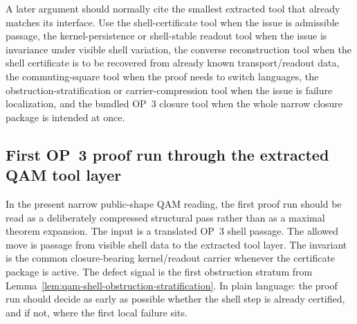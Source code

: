 \begin{remark}\label{rem:qam-op3-tool-usage}
A later argument should normally cite the smallest extracted tool that already matches its interface. Use the shell-certificate tool when the issue is admissible passage, the kernel-persistence or shell-stable readout tool when the issue is invariance under visible shell variation, the converse reconstruction tool when the shell certificate is to be recovered from already known transport/readout data, the commuting-square tool when the proof needs to switch languages, the obstruction-stratification or carrier-compression tool when the issue is failure localization, and the bundled OP~3 closure tool when the whole narrow closure package is intended at once.
\end{remark}


\subsection*{First OP~3 proof run through the extracted QAM tool layer}

\begin{remark}\label{rem:qam-op3-proof-run-reading-key}
In the present narrow public-shape QAM reading, the first proof run should be read as a deliberately compressed structural pass rather than as a maximal theorem expansion. The input is a translated OP~3 shell passage. The allowed move is passage from visible shell data to the extracted tool layer. The invariant is the common closure-bearing kernel/readout carrier whenever the certificate package is active. The defect signal is the first obstruction stratum from Lemma~\ref{lem:qam-shell-obstruction-stratification}. In plain language: the proof run should decide as early as possible whether the shell step is already certified, and if not, where the first local failure sits.
\end{remark}

